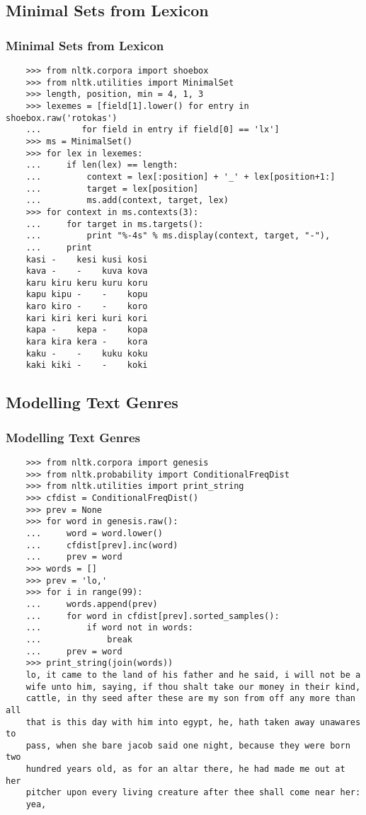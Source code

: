 \documentclass{beamer}             %
\begin{document}
\subsection{Minimal Sets from Lexicon}
\begin{frame}[fragile]
  \frametitle{Minimal Sets from Lexicon}
  \tiny
\begin{verbatim}
    >>> from nltk.corpora import shoebox
    >>> from nltk.utilities import MinimalSet
    >>> length, position, min = 4, 1, 3
    >>> lexemes = [field[1].lower() for entry in shoebox.raw('rotokas')
    ...		   for field in entry if field[0] == 'lx']
    >>> ms = MinimalSet()
    >>> for lex in lexemes:
    ...     if len(lex) == length:
    ...         context = lex[:position] + '_' + lex[position+1:]
    ...         target = lex[position]
    ...         ms.add(context, target, lex)
    >>> for context in ms.contexts(3):
    ...     for target in ms.targets():
    ...         print "%-4s" % ms.display(context, target, "-"),
    ...     print
    kasi -    kesi kusi kosi
    kava -    -    kuva kova
    karu kiru keru kuru koru
    kapu kipu -    -    kopu
    karo kiro -    -    koro
    kari kiri keri kuri kori
    kapa -    kepa -    kopa
    kara kira kera -    kora
    kaku -    -    kuku koku
    kaki kiki -    -    koki
\end{verbatim}
\end{frame}


\subsection{Modelling Text Genres}
\begin{frame}[fragile]
  \frametitle{Modelling Text Genres}
  \tiny
\begin{verbatim}
    >>> from nltk.corpora import genesis
    >>> from nltk.probability import ConditionalFreqDist
    >>> from nltk.utilities import print_string
    >>> cfdist = ConditionalFreqDist()
    >>> prev = None
    >>> for word in genesis.raw():
    ...     word = word.lower()
    ...     cfdist[prev].inc(word)
    ...     prev = word
    >>> words = []
    >>> prev = 'lo,'
    >>> for i in range(99):
    ...     words.append(prev)
    ...     for word in cfdist[prev].sorted_samples():
    ...         if word not in words:
    ...             break
    ...     prev = word
    >>> print_string(join(words))
    lo, it came to the land of his father and he said, i will not be a
    wife unto him, saying, if thou shalt take our money in their kind,
    cattle, in thy seed after these are my son from off any more than all
    that is this day with him into egypt, he, hath taken away unawares to
    pass, when she bare jacob said one night, because they were born two
    hundred years old, as for an altar there, he had made me out at her
    pitcher upon every living creature after thee shall come near her:
    yea,
\end{verbatim}
\end{frame}
\end{document}
